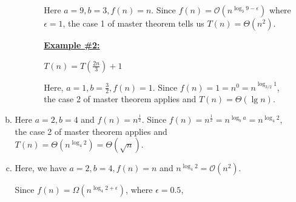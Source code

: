 \documentclass[12pt]{article}
\begin{document}
\begin{enumerate}[1.]
\begin{enumerate}[a)]
\begin{itemize}
\begin{itemize}
                Here $a = 9, b = 3, f(n) = n$. Since $f(n) = \mathcal{O}(n^{\log_3 9 - \epsilon})$
                where $\epsilon = 1$, the case 1 of master theorem tells us $T(n) = \Theta(n^2)$.

                \bigskip

                \underline{\textbf{Example \#2:}}

                \bigskip

                $T(n) = T(\frac{2n}{3}) + 1$

                \bigskip

                Here, $a = 1, b = \frac{3}{2}, f(n) = 1$. Since $f(n) = 1 = n^0 = n^{\log_{3/2} 1}$,
                the case 2 of master theorem applies and $T(n) = \Theta(\lg n)$.

            \end{itemize}
        \end{itemize}

        \bigskip

        \item

        Here $a = 2, b = 4$ and $f(n) = n^{\frac{1}{2}}$. Since $f(n) = n^{\frac{1}{2}} = n^{\log_b a} = n^{\log_4 2}$,
        the case 2 of master theorem applies and $T(n) = \Theta(n^{\log_4 2}) = \Theta(\sqrt{n})$.

        \item

        Here, we have $a = 2, b = 4, f(n) = n$ and $n^{\log_4 2} = \mathcal{O}(n^2)$.

        \bigskip

        Since $f(n) = \Omega(n^{\log_4 2 + \epsilon})$, where $\epsilon = 0.5$,

        \bigskip



    \end{enumerate}

\end{enumerate}
\end{document}
